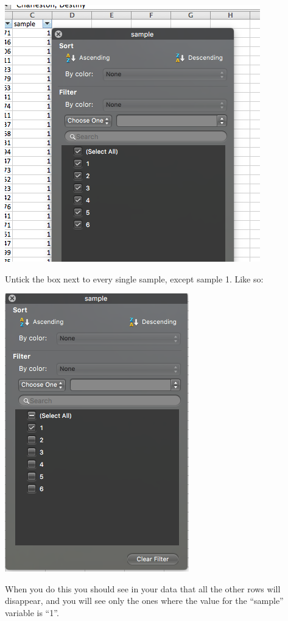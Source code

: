 \documentclass[
]{book}
\begin{document}
\includegraphics{imgs/filter_options.png}

Untick the box next to every single sample, except sample 1. Like so:

\includegraphics{imgs/filter_sample_1.png}

When you do this you should see in your data that all the other rows will disappear, and you will see only the ones where the value for the ``sample'' variable is ``1''.
\end{document}
